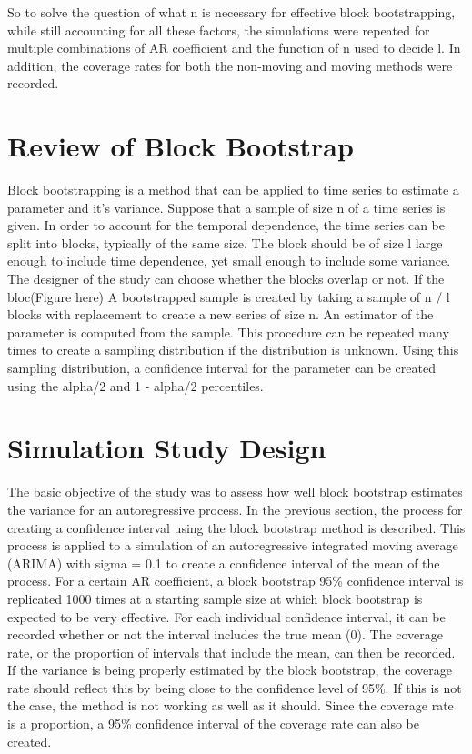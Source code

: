 \documentclass[12pt, letterpaper, titlepage]{article}
\begin{document}
So to solve the question of what n is necessary for effective block bootstrapping,
while still accounting for all these factors, the simulations were repeated for
multiple combinations of AR coefficient and the function of n used to decide l. In 
addition, the coverage rates
for both the non-moving and moving methods were recorded.

\section{Review of Block Bootstrap}
\label{sec:blkbootreview}

Block bootstrapping is a method that can be applied to time series to estimate a parameter and it's variance. Suppose that a sample of size n of a time series is given. In order to account for the temporal dependence, the time series can be split into blocks, typically of the same size. The block should be of size l large enough to include time dependence, yet small enough to include some variance. The designer of the study can choose whether the blocks overlap or not. If the bloc(Figure here) A bootstrapped sample is created by taking a sample of n / l blocks with replacement to create a new series of size n. An estimator of the parameter is computed from the sample. This procedure can be repeated many times to create a sampling distribution if the distribution is unknown. Using this sampling distribution, a confidence interval for the parameter can be created using the alpha/2 and 1 - alpha/2 percentiles.



\section{Simulation Study Design}
\label{sec:simdesign}

The basic objective of the study was to assess how well block bootstrap estimates the variance for an autoregressive process. In the previous section, the process for creating a confidence interval using the block bootstrap method is described. This process is applied to a simulation of an autoregressive integrated moving average (ARIMA) with sigma = 0.1 to create a confidence interval of the mean of the process. For a certain AR coefficient, a block bootstrap 95\% confidence interval is replicated 1000 times at a starting sample size at which block bootstrap is expected to be very effective. For each individual confidence interval, it can be recorded whether or not the interval includes the true mean (0). The coverage rate, or the proportion of intervals that include the mean, can then be recorded. If the variance is being properly estimated by the block bootstrap, the coverage rate should reflect this by being close to the confidence level of 95\%. If this is not the case, the method is not working as well as it should. Since the coverage rate is a proportion, a 95\% confidence interval of the coverage rate can also be created.
\end{document}
